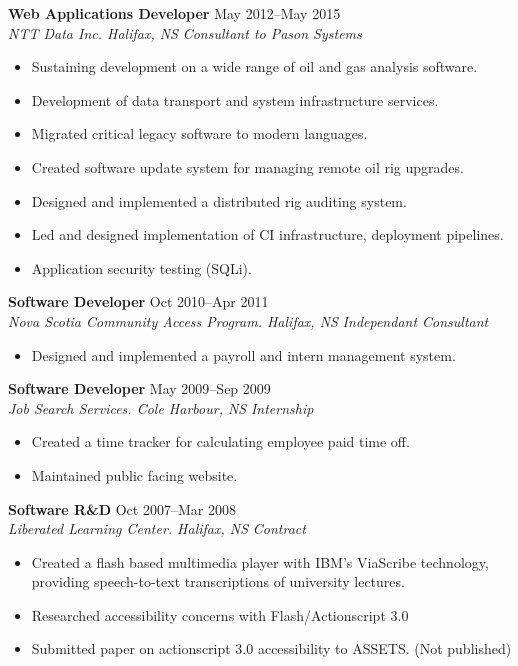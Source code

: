 \documentclass[line,margin]{res}
\begin{document}
\begin{resume}
\textbf{Web Applications Developer} \hfill May 2012--May 2015 \\
\textit{NTT Data Inc. Halifax, NS} \hfill \textit{Consultant to Pason Systems}
\begin{itemize} \itemsep-2pt
    \item Sustaining development on a wide range of oil and gas analysis software.
    \item Development of data transport and system infrastructure services.
    \item Migrated critical legacy software to modern languages.
    \item Created software update system for managing remote oil rig upgrades.
    \item Designed and implemented a distributed rig auditing system.
    \item Led and designed implementation of CI infrastructure, deployment pipelines.
    \item Application security testing (SQLi).
\end{itemize}

\textbf{Software Developer} \hfill Oct 2010--Apr 2011 \\
\textit{Nova Scotia Community Access Program. Halifax, NS} \hfill \textit{Independant Consultant}
\begin{itemize}  \itemsep-2pt
    \item Designed and implemented a payroll and intern management system.
\end{itemize} 

\textbf{Software Developer} \hfill May 2009--Sep 2009 \\
\textit{Job Search Services. Cole Harbour, NS} \hfill \textit{Internship}
\begin{itemize} \itemsep-2pt
    \item Created a time tracker for calculating employee paid time off.
    \item Maintained public facing website.
\end{itemize}

\textbf{Software R\&D} \hfill Oct 2007--Mar 2008 \\
\textit{Liberated Learning Center. Halifax, NS} \hfill \textit{Contract}
\begin{itemize} \itemsep-2pt
    \item Created a flash based multimedia player with IBM's ViaScribe technology, providing speech-to-text transcriptions of university lectures.
    \item Researched accessibility concerns with Flash/Actionscript 3.0
    \item Submitted paper on actionscript 3.0 accessibility to ASSETS. (Not published)
\end{itemize}


\end{resume}
\end{document}
